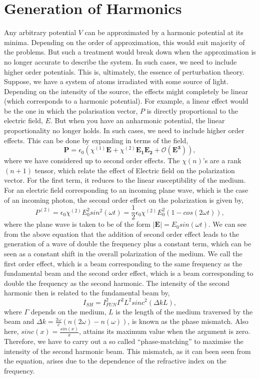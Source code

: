 \section{Generation of Harmonics}
Any arbitrary potential $V$ can be approximated by a harmonic potential at its minima. Depending on the order of approximation, this would suit majority of the problems. But such a treatment would break down when the approximation is no longer accurate to describe the system. In such cases, we need to include higher order potentials. This is, ultimately, the essence of perturbation theory. Suppose, we have a system of atoms irradiated with some source of light. Depending on the intensity of the source, the effects might completely be linear (which corresponds to a harmonic potential). For example, a linear effect would be the one in which the polarisation vector, $P$ is directly proportional to the electric field, $E$. But when you have an anharmonic potential, the linear proportionality no longer holds. In such cases, we need to include higher order effects. This can be done by expanding in terms of the field,
\begin{equation}
    \bm{P} = \epsilon_0 \left( \chi^{(1)} \bm{E} + \chi^{(2)} \bm{E_1E_2} + \mathcal{O}\bm{(E^3)} \right),
\end{equation}
where we have considered up to second order effects. The $\chi(n)$'s are a rank $(n+1)$ tensor, which relate the effect of Electric field on the polarization vector. For the first term, it reduces to the linear susceptibility of the medium. For an electric field corresponding to an incoming plane wave, which is the case of an incoming photon, the second order effect on the polarization is given by,
\begin{equation}
    P^{(2)} = \epsilon_0 \chi^{(2)} E_0^2 sin^2(\omega t) = \frac{1}{2} \epsilon_0 \chi^{(2)} E_0^2 (1 - cos(2\omega t)),
\end{equation}
where the plane wave is taken to be of the form $\lvert \bm{E} \rvert = E_0 sin(\omega t)$. We can see from the above equation that the addition of second order effect leads to the generation of a wave of double the frequency plus a constant term, which can be seen as a constant shift in the overall polarization of the medium. We call the first order effect, which is a beam corresponding to the same frequency as the fundamental beam and the second order effect, which is a beam corresponding to double the frequency as the second harmonic. The intensity of the second harmonic then is related to the fundamental beam by,
\begin{equation}
    I_{SH} = I_{FUN}^2 \Gamma^2 L^2 sinc^2(\Delta k L),
\end{equation}
where $\Gamma$ depends on the medium, $L$ is the length of the medium traversed by the beam and $\Delta k = \frac{2\omega}{c}(n(2\omega)-n(\omega))$, is known as the phase mismatch. Also here, $sinc(x) = \frac{sin(x)}{x}$, attains its maximum value when the argument is zero. Therefore, we have to carry out a so called ``phase-matching'' to maximise the intensity of the second harmonic beam. This mismatch, as it can been seen from the equation, arises due to the dependence of the refractive index on the frequency.

